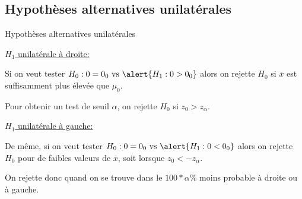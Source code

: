 \documentclass{BeamerTemplate}
\begin{document}
\subsection{Hypothèses alternatives unilatérales}

\begin{frame}[t]{Hypothèses alternatives unilatérales}

{\small
\underline{$H_1$ unilatérale à droite:}

Si on veut tester $H_0 : \mu = \mu_0 \mbox{ vs } \alert{H_1 : \mu > \mu_0}$ alors on rejette $H_0$ si $\overline{x}$ est suffisamment plus élevée que $\mu_0$.

\medskip
Pour obtenir un  test de seuil $\alpha$, on rejette $H_0$ si \alert{$z_0>z_\alpha$}.

\medskip

\underline{$H_1$ unilatérale à gauche:}

De même, si on veut tester $H_0 : \mu = \mu_0 \mbox{ vs }\alert{H_1 : \mu < \mu_0}$ alors on rejette $H_0$ pour de faibles valeurs de $\overline{x}$, soit lorsque \alert{$z_0<-z_\alpha$}.
}

\bigskip

On rejette donc quand on se trouve dans le $100*\alpha\%$ moins probable à droite ou à gauche.
\end{frame}
\end{document}
